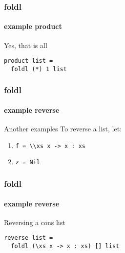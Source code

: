 \begin{frame}[fragile]
\frametitle{foldl}
\framesubtitle{example \textemdash product}

\begin{block}{Yes, that is all}

\end{block}

\hrulefill

\begin{lstlisting}
product list =
  foldl (*) 1 list
\end{lstlisting}

\end{frame}


\begin{frame}
\frametitle{foldl}
\framesubtitle{example \textemdash reverse}

\begin{block}{Another examples}
To reverse a list, let:
\begin{enumerate}
\item \lstinline[basicstyle=\ttfamily]$f = \\xs x -> x : xs$
\item \lstinline[basicstyle=\ttfamily]$z = Nil$
\end{enumerate}
\end{block}

\end{frame}


\begin{frame}[fragile]
\frametitle{foldl}
\framesubtitle{example \textemdash reverse}

\begin{block}{Reversing a cons list}

\end{block}

\hrulefill

\begin{lstlisting}
reverse list =
  foldl (\xs x -> x : xs) [] list
\end{lstlisting}

\end{frame}


